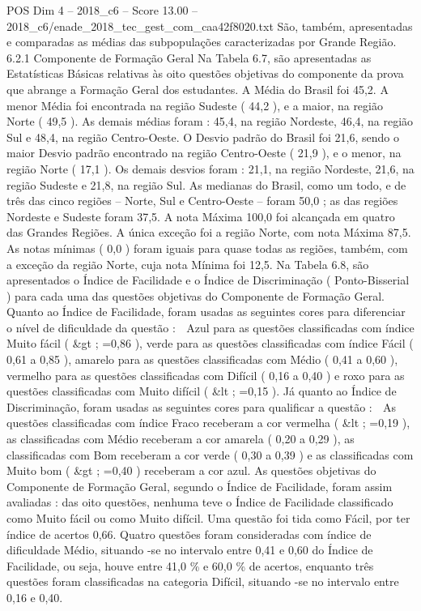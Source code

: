\begin{textsample}{POS Dim 4 – 2018\_c6 – Score 13.00 – 2018\_c6/enade\_2018\_tec\_gest\_com\_caa42f8020.txt}
São, também, apresentadas e comparadas as médias das subpopulações caracterizadas por Grande Região. 6.2.1 Componente de Formação Geral Na Tabela 6.7, são apresentadas as Estatísticas Básicas relativas às oito questões objetivas do componente da prova que abrange a Formação Geral dos estudantes.
A Média do Brasil foi 45,2.
A menor Média foi encontrada na região Sudeste ( 44,2 ), e a maior, na região Norte ( 49,5 ).
As demais médias foram : 45,4, na região Nordeste, 46,4, na região Sul e 48,4, na região Centro-Oeste.
O Desvio padrão do Brasil foi 21,6, sendo o maior Desvio padrão encontrado na região Centro-Oeste ( 21,9 ), e o menor, na região Norte ( 17,1 ).
Os demais desvios foram : 21,1, na região Nordeste, 21,6, na região Sudeste e 21,8, na região Sul.
As medianas do Brasil, como um todo, e de três das cinco regiões – Norte, Sul e Centro-Oeste – foram 50,0 ; as das regiões Nordeste e Sudeste foram 37,5.
A nota Máxima 100,0 foi alcançada em quatro das Grandes Regiões.
A única exceção foi a região Norte, com nota Máxima 87,5.
As notas mínimas ( 0,0 ) foram iguais para quase todas as regiões, também, com a exceção da região Norte, cuja nota Mínima foi 12,5.
Na Tabela 6.8, são apresentados o Índice de Facilidade e o Índice de Discriminação ( Ponto-Bisserial ) para cada uma das questões objetivas do Componente de Formação Geral.
Quanto ao Índice de Facilidade, foram usadas as seguintes cores para diferenciar o nível de dificuldade da questão :  Azul para as questões classificadas com índice Muito fácil ( \&gt ; =0,86 ), verde para as questões classificadas com índice Fácil ( 0,61 a 0,85 ), amarelo para as questões classificadas com Médio ( 0,41 a 0,60 ), vermelho para as questões classificadas com Difícil ( 0,16 a 0,40 ) e roxo para as questões classificadas com Muito difícil ( \&lt ; =0,15 ).
Já quanto ao Índice de Discriminação, foram usadas as seguintes cores para qualificar a questão :  As questões classificadas com índice Fraco receberam a cor vermelha ( \&lt ; =0,19 ), as classificadas com Médio receberam a cor amarela ( 0,20 a 0,29 ), as classificadas com Bom receberam a cor verde ( 0,30 a 0,39 ) e as classificadas com Muito bom ( \&gt ; =0,40 ) receberam a cor azul.
As questões objetivas do Componente de Formação Geral, segundo o Índice de Facilidade, foram assim avaliadas : das oito questões, nenhuma teve o Índice de Facilidade classificado como Muito fácil ou como Muito difícil.
Uma questão foi tida como Fácil, por ter índice de acertos 0,66.
Quatro questões foram consideradas com índice de dificuldade Médio, situando -se no intervalo entre 0,41 e 0,60 do Índice de Facilidade, ou seja, houve entre 41,0 \% e 60,0 \% de acertos, enquanto três questões foram classificadas na categoria Difícil, situando -se no intervalo entre 0,16 e 0,40.

\end{textsample}
